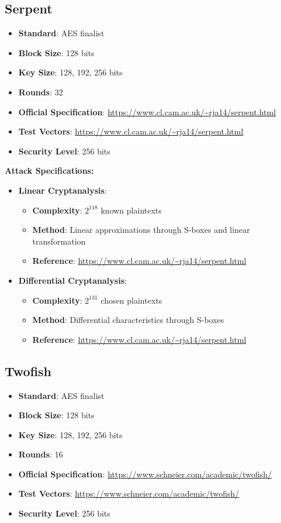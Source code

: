 \documentclass[11pt,a4paper]{article}
\begin{document}
\subsection{Serpent}
\begin{itemize}
    \item \textbf{Standard}: AES finalist
    \item \textbf{Block Size}: 128 bits
    \item \textbf{Key Size}: 128, 192, 256 bits
    \item \textbf{Rounds}: 32
    \item \textbf{Official Specification}: \url{https://www.cl.cam.ac.uk/~rja14/serpent.html}
    \item \textbf{Test Vectors}: \url{https://www.cl.cam.ac.uk/~rja14/serpent.html}
    \item \textbf{Security Level}: 256 bits
\end{itemize}

\textbf{Attack Specifications:}
\begin{itemize}
    \item \textbf{Linear Cryptanalysis}: 
    \begin{itemize}
        \item \textbf{Complexity}: $2^{118}$ known plaintexts
        \item \textbf{Method}: Linear approximations through S-boxes and linear transformation
        \item \textbf{Reference}: \url{https://www.cl.cam.ac.uk/~rja14/serpent.html}
    \end{itemize}
    \item \textbf{Differential Cryptanalysis}: 
    \begin{itemize}
        \item \textbf{Complexity}: $2^{131}$ chosen plaintexts
        \item \textbf{Method}: Differential characteristics through S-boxes
        \item \textbf{Reference}: \url{https://www.cl.cam.ac.uk/~rja14/serpent.html}
    \end{itemize}
\end{itemize}

\subsection{Twofish}
\begin{itemize}
    \item \textbf{Standard}: AES finalist
    \item \textbf{Block Size}: 128 bits
    \item \textbf{Key Size}: 128, 192, 256 bits
    \item \textbf{Rounds}: 16
    \item \textbf{Official Specification}: \url{https://www.schneier.com/academic/twofish/}
    \item \textbf{Test Vectors}: \url{https://www.schneier.com/academic/twofish/}
    \item \textbf{Security Level}: 256 bits
\end{itemize}
\end{document}
